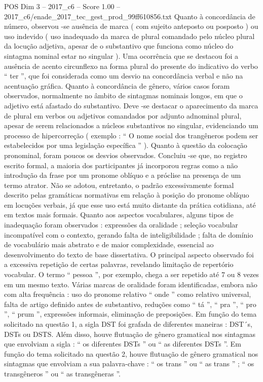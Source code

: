 \begin{textsample}{POS Dim 3 – 2017\_c6 – Score 1.00 – 2017\_c6/enade\_2017\_tec\_gest\_prod\_99ff610856.txt}
Quanto à concordância de número, observou -se ausência de marca ( com sujeito anteposto ou posposto ) ou uso indevido ( uso inadequado da marca de plural comandado pelo núcleo plural da locução adjetiva, apesar de o substantivo que funciona como núcleo do sintagma nominal estar no singular ).
Uma ocorrência que se destacou foi a ausência de acento circunflexo na forma plural do presente do indicativo do verbo “ ter ”, que foi considerada como um desvio na concordância verbal e não na acentuação gráfica.
Quanto à concordância de gênero, vários casos foram observados, normalmente no âmbito de sintagmas nominais longos, em que o adjetivo está afastado do substantivo.
Deve -se destacar o aparecimento da marca de plural em verbos ou adjetivos comandados por adjunto adnominal plural, apesar de serem relacionados a núcleos substantivos no singular, evidenciando um processo de hipercorreção ( exemplo : “ O nome social dos trangêneros podem ser estabelecidos por uma legislação específica ” ).
Quanto à questão da colocação pronominal, foram poucos os desvios observados.
Concluiu -se que, no registro escrito formal, a maioria dos participantes já incorporou regras como a não introdução da frase por um pronome oblíquo e a próclise na presença de um termo atrator.
Não se adotou, entretanto, o padrão excessivamente formal descrito pelas gramáticas normativas em relação à posição do pronome oblíquo em locuções verbais, já que esse uso está muito distante da prática cotidiana, até em textos mais formais.
Quanto aos aspectos vocabulares, alguns tipos de inadequação foram observados : expressões da oralidade ; seleção vocabular incompatível com o contexto, gerando falta de inteligibilidade ; falta de domínio de vocabulário mais abstrato e de maior complexidade, essencial ao desenvolvimento do texto de base dissertativa.
O principal aspecto observado foi a excessiva repetição de certas palavras, revelando limitação de repertório vocabular.
O termo “ pessoa ”, por exemplo, chega a ser repetido até 7 ou 8 vezes em um mesmo texto.
Várias marcas de oralidade foram identificadas, embora não com alta frequência : uso do pronome relativo “ onde ” como relativo universal, falta de artigo definido antes de substantivo, reduções como “ tá ”, “ pra ”, “ pro ”, “ prum ”, expressões informais, eliminação de preposições.
Em função do tema solicitado na questão 1, a sigla DST foi grafada de diferentes maneiras : DST´s, DSTs ou DSTS.
Além disso, houve flutuação de gênero gramatical nos sintagmas que envolviam a sigla : “ os diferentes DSTs ” ou “ as diferentes DSTs ”.
Em função do tema solicitado na questão 2, houve flutuação de gênero gramatical nos sintagmas que envolviam a sua palavra-chave : “ os trans ” ou “ as trans ” ; “ os transgêneros ” ou “ as transgêneras ”.

\end{textsample}
